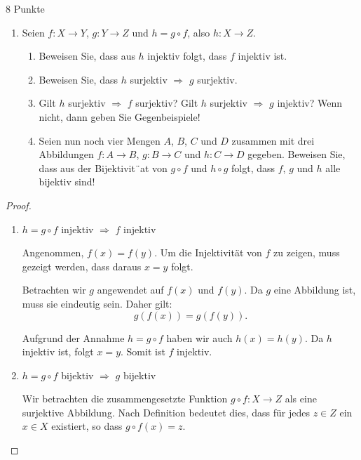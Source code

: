 \documentclass{problemset}
\begin{document}
\pagebreak

\begin{problem}{8 Punkte}
\begin{enumerate}
    \item Seien $f: X \to Y$, $g: Y \to Z$ und $h = g \circ f$, also $h: X \to Z$.
          \begin{enumerate}
              \item Beweisen Sie, dass aus $h$ injektiv folgt, dass $f$ injektiv ist.
              \item Beweisen Sie, dass $h$ surjektiv $\Rightarrow$ $g$ surjektiv.
              \item Gilt $h$ surjektiv $\Rightarrow$ $f$ surjektiv? Gilt $h$ surjektiv $\Rightarrow$ $g$ injektiv? Wenn nicht, dann geben Sie Gegenbeispiele!
              \item Seien nun noch vier Mengen $A$, $B$, $C$ und $D$ zusammen mit drei Abbildungen $f: A \to B$, $g: B \to C$ und $h: C \to D$ gegeben. Beweisen Sie, dass aus der Bijektivit¨at von $g \circ f$ und $h \circ g$ folgt, dass $f$, $g$ und $h$ alle bijektiv sind!
          \end{enumerate}

\end{enumerate}

\begin{proof} $ $
    \begin{enumerate}
        \item $h = g \circ f$ injektiv $\Rightarrow$ $f$ injektiv

              Angenommen, $f(x) = f(y)$. Um die Injektivität von $f$ zu zeigen, muss gezeigt werden, dass daraus $x = y$ folgt.

              Betrachten wir $g$ angewendet auf $f(x)$ und $f(y)$. Da $g$ eine Abbildung ist, muss sie eindeutig sein. Daher gilt:
              \[
                  g(f(x)) = g(f(y)).
              \]

              Aufgrund der Annahme $h = g \circ f$ haben wir auch $h(x) = h(y)$.
              Da $h$ injektiv ist, folgt $x = y$. Somit ist $f$ injektiv. \checkmark
        \item $h = g \circ f$ bijektiv $\Rightarrow$ $g$ bijektiv

              Wir betrachten die zusammengesetzte Funktion \(g \circ f: X \to Z\) als eine surjektive Abbildung. Nach Definition bedeutet dies, dass für jedes \(z \in Z\) ein \(x \in X\) existiert, so dass \(g \circ f(x) = z\).


\end{enumerate}
\end{proof}
\end{problem}
\end{document}

